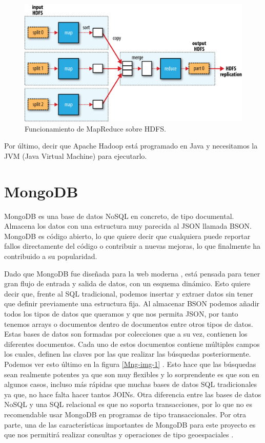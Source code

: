 \begin{figure}[htp]
\centering
\includegraphics[scale=0.28]{Imagenes/hadoop1.png}
\caption{Funcionamiento de MapReduce sobre HDFS.}
\label{hdImg1}
\end{figure}

Por último, decir que Apache Hadoop está programado en Java y necesitamos
la JVM (Java Virtual Machine) para ejecutarlo.


\section{MongoDB\label{MongoDB}}

MongoDB es una base de datos NoSQL en concreto, de tipo documental.
Almacena los datos con una estructura muy parecida al JSON llamada BSON.
MongoDB es código abierto, lo que quiere decir que cualquiera puede
reportar fallos directamente del código o contribuir a nuevas mejoras, lo
que finalmente ha contribuido a su popularidad.

Dado que MongoDB fue diseñada para la web moderna \cite{Mng-2}, está
pensada para tener gran flujo de entrada y salida de datos, con un esquema
dinámico. Esto quiere decir que, frente al SQL tradicional, podemos
insertar y extraer datos sin tener que definir previamente una estructura
fija. Al almacenar BSON podemos añadir todos los tipos de datos que
queramos y que nos permita JSON, por tanto tenemos arrays o documentos
dentro de documentos entre otros tipos de datos. Estas bases de datos son
formadas por colecciones que a su vez, contienen los diferentes documentos.
Cada uno de estos documentos contiene múltiples campos los cuales, definen
las claves por las que realizar las búsquedas posteriormente. Podemos ver
esto último en la figura \ref{Mng-img-1} \cite{Mng-5}. Esto hace que las
búsquedas sean realmente potentes ya que son muy flexibles y lo
sorprendente es que son en algunos casos, incluso más rápidas que muchas
bases de datos SQL tradicionales ya que, no hace falta hacer tantos JOINs.
Otra diferencia entre las bases de datos NoSQL y una SQL relacional es que
no soporta transacciones, por lo que no es recomendable usar MongoDB en
programas de tipo transaccionales. Por otra parte, una de las
características importantes de MongoDB para este proyecto es que nos
permitirá realizar consultas y operaciones de tipo geoespaciales
\cite{Mng-3}.


